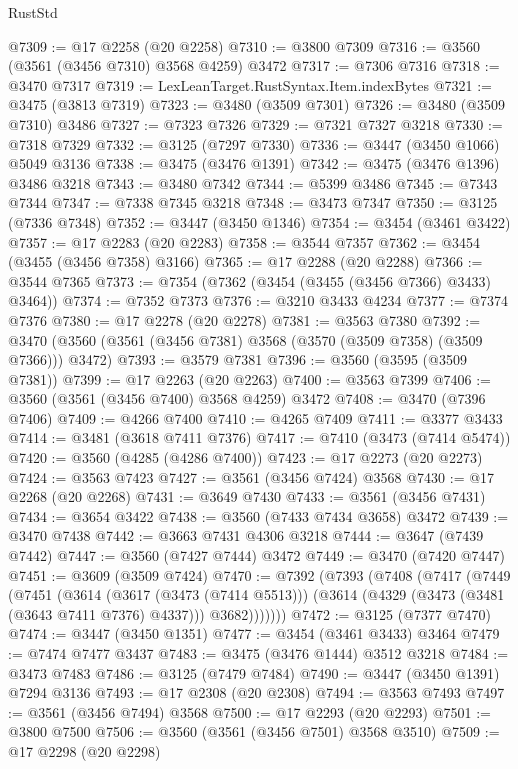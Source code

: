 \begin{lexlean}{RustStd}
\begin{coremodule}
@7309 := @17 @2258 (@20 @2258)
@7310 := @3800 @7309
@7316 := @3560 (@3561 (@3456 @7310) @3568 @4259) @3472
@7317 := @7306 @7316
@7318 := @3470 @7317
@7319 := LexLeanTarget.RustSyntax.Item.indexBytes
@7321 := @3475 (@3813 @7319)
@7323 := @3480 (@3509 @7301)
@7326 := @3480 (@3509 @7310) @3486
@7327 := @7323 @7326
@7329 := @7321 @7327 @3218
@7330 := @7318 @7329
@7332 := @3125 (@7297 @7330)
@7336 := @3447 (@3450 @1066) @5049 @3136
@7338 := @3475 (@3476 @1391)
@7342 := @3475 (@3476 @1396) @3486 @3218
@7343 := @3480 @7342
@7344 := @5399 @3486
@7345 := @7343 @7344
@7347 := @7338 @7345 @3218
@7348 := @3473 @7347
@7350 := @3125 (@7336 @7348)
@7352 := @3447 (@3450 @1346)
@7354 := @3454 (@3461 @3422)
@7357 := @17 @2283 (@20 @2283)
@7358 := @3544 @7357
@7362 := @3454 (@3455 (@3456 @7358) @3166)
@7365 := @17 @2288 (@20 @2288)
@7366 := @3544 @7365
@7373 := @7354 (@7362 (@3454 (@3455 (@3456 @7366) @3433) @3464))
@7374 := @7352 @7373
@7376 := @3210 @3433 @4234
@7377 := @7374 @7376
@7380 := @17 @2278 (@20 @2278)
@7381 := @3563 @7380
@7392 := @3470 (@3560 (@3561 (@3456 @7381) @3568 (@3570 (@3509 @7358) (@3509 @7366))) @3472)
@7393 := @3579 @7381
@7396 := @3560 (@3595 (@3509 @7381))
@7399 := @17 @2263 (@20 @2263)
@7400 := @3563 @7399
@7406 := @3560 (@3561 (@3456 @7400) @3568 @4259) @3472
@7408 := @3470 (@7396 @7406)
@7409 := @4266 @7400
@7410 := @4265 @7409
@7411 := @3377 @3433
@7414 := @3481 (@3618 @7411 @7376)
@7417 := @7410 (@3473 (@7414 @5474))
@7420 := @3560 (@4285 (@4286 @7400))
@7423 := @17 @2273 (@20 @2273)
@7424 := @3563 @7423
@7427 := @3561 (@3456 @7424) @3568
@7430 := @17 @2268 (@20 @2268)
@7431 := @3649 @7430
@7433 := @3561 (@3456 @7431)
@7434 := @3654 @3422
@7438 := @3560 (@7433 @7434 @3658) @3472
@7439 := @3470 @7438
@7442 := @3663 @7431 @4306 @3218
@7444 := @3647 (@7439 @7442)
@7447 := @3560 (@7427 @7444) @3472
@7449 := @3470 (@7420 @7447)
@7451 := @3609 (@3509 @7424)
@7470 := @7392
    (@7393
      (@7408
        (@7417
          (@7449
            (@7451
              (@3614
                (@3617 (@3473 (@7414 @5513)))
                (@3614 (@4329 (@3473 (@3481 (@3643 @7411 @7376) @4337))) @3682)))))))
@7472 := @3125 (@7377 @7470)
@7474 := @3447 (@3450 @1351)
@7477 := @3454 (@3461 @3433) @3464
@7479 := @7474 @7477 @3437
@7483 := @3475 (@3476 @1444) @3512 @3218
@7484 := @3473 @7483
@7486 := @3125 (@7479 @7484)
@7490 := @3447 (@3450 @1391) @7294 @3136
@7493 := @17 @2308 (@20 @2308)
@7494 := @3563 @7493
@7497 := @3561 (@3456 @7494) @3568
@7500 := @17 @2293 (@20 @2293)
@7501 := @3800 @7500
@7506 := @3560 (@3561 (@3456 @7501) @3568 @3510)
@7509 := @17 @2298 (@20 @2298)

\end{coremodule}
\end{lexlean}
